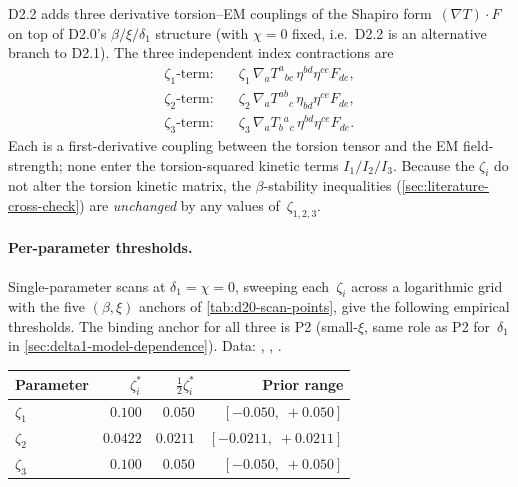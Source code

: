 D2.2 adds three derivative torsion--EM couplings of the Shapiro
form~$(\nabla T)\cdot F$ on top of D2.0's $\beta/\xi/\delta_1$
structure (with $\chi=0$ fixed, i.e.\ D2.2 is an alternative branch
to D2.1).  The three independent index contractions are
\begin{align*}
  \zeta_1\text{-term:} &\quad \zeta_1\,\nabla_a T^{a}{}_{bc}\,
    \eta^{bd}\eta^{ce}F_{de}, \\
  \zeta_2\text{-term:} &\quad \zeta_2\,\nabla_a T^{ab}{}_{c}\,
    \eta_{bd}\eta^{ce}F_{de}, \\
  \zeta_3\text{-term:} &\quad \zeta_3\,\nabla_a T_b{}^{a}{}_c\,
    \eta^{bd}\eta^{ce}F_{de}.
\end{align*}
Each is a first-derivative coupling between the torsion tensor and the
EM field-strength; none enter the torsion-squared kinetic terms
$I_1/I_2/I_3$.  Because the $\zeta_i$ do not alter the torsion kinetic
matrix, the $\beta$-stability inequalities (\cref{sec:literature-cross-check})
are \emph{unchanged} by any values of~$\zeta_{1,2,3}$.

\paragraph{Per-parameter thresholds.}
Single-parameter scans at $\delta_1=\chi=0$, sweeping each~$\zeta_i$
across a logarithmic grid with the five $(\beta,\xi)$ anchors of
\cref{tab:d20-scan-points}, give the following empirical thresholds.
The binding anchor for all three is P2 (small-$\xi$, same role as P2
for~$\delta_1$ in \cref{sec:delta1-model-dependence}).
Data: ,
, .

\begin{center}
\begin{tabular}{lrrr}
\toprule
Parameter & $\zeta_i^*$ & $\frac{1}{2}\zeta_i^*$ & Prior range \\
\midrule
$\zeta_1$ & $0.100$ & $0.050$ & $[-0.050,\;+0.050]$ \\
$\zeta_2$ & $0.0422$ & $0.0211$ & $[-0.0211,\;+0.0211]$ \\
$\zeta_3$ & $0.100$ & $0.050$ & $[-0.050,\;+0.050]$ \\
\bottomrule
\end{tabular}
\end{center}

